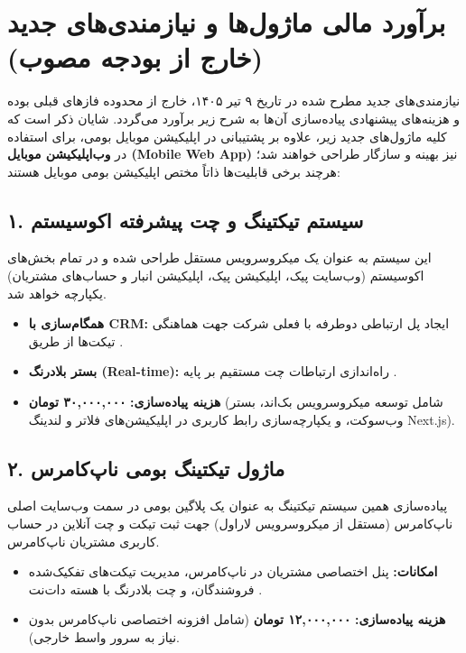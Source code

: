 \documentclass[11pt,a4paper]{article}
\begin{document}
\section{برآورد مالی ماژول‌ها و نیازمندی‌های جدید (خارج از بودجه مصوب)}
نیازمندی‌های جدید مطرح شده در تاریخ ۹ تیر ۱۴۰۵، خارج از محدوده فازهای قبلی بوده و هزینه‌های پیشنهادی پیاده‌سازی آن‌ها به شرح زیر برآورد می‌گردد. شایان ذکر است که کلیه ماژول‌های جدید زیر، علاوه بر پشتیبانی در اپلیکیشن موبایل بومی، برای استفاده در \textbf{وب‌اپلیکیشن موبایل (Mobile Web App)} نیز بهینه و سازگار طراحی خواهند شد؛ هرچند برخی قابلیت‌ها ذاتاً مختص اپلیکیشن بومی موبایل هستند:

\subsection{۱. سیستم تیکتینگ و چت پیشرفته اکوسیستم }
این سیستم به عنوان یک میکروسرویس مستقل طراحی شده و در تمام بخش‌های اکوسیستم (وب‌سایت پیک، اپلیکیشن پیک، اپلیکیشن انبار و حساب‌های مشتریان) یکپارچه خواهد شد.
\begin{itemize}
    \item \textbf{همگام‌سازی با CRM:} ایجاد پل ارتباطی دوطرفه با  فعلی شرکت جهت هماهنگی تیکت‌ها از طریق .
    \item \textbf{بستر بلادرنگ (Real-time):} راه‌اندازی ارتباطات چت مستقیم بر پایه .
    \item \textbf{هزینه پیاده‌سازی:} \textbf{۳۰,۰۰۰,۰۰۰ تومان} (شامل توسعه میکروسرویس بک‌اند، بستر وب‌سوکت، و یکپارچه‌سازی رابط کاربری در اپلیکیشن‌های فلاتر و لندینگ Next.js).
\end{itemize}

\subsection{۲. ماژول تیکتینگ بومی ناپ‌کامرس }
پیاده‌سازی همین سیستم تیکتینگ به عنوان یک پلاگین بومی در سمت وب‌سایت اصلی ناپ‌کامرس (مستقل از میکروسرویس لاراول) جهت ثبت تیکت و چت آنلاین در حساب کاربری مشتریان ناپ‌کامرس.
\begin{itemize}
    \item \textbf{امکانات:} پنل اختصاصی مشتریان در ناپ‌کامرس، مدیریت تیکت‌های تفکیک‌شده فروشندگان، و چت بلادرنگ با هسته دات‌نت .
    \item \textbf{هزینه پیاده‌سازی:} \textbf{۱۲,۰۰۰,۰۰۰ تومان} (شامل افزونه اختصاصی ناپ‌کامرس بدون نیاز به سرور واسط خارجی).
\end{itemize}
\end{document}
